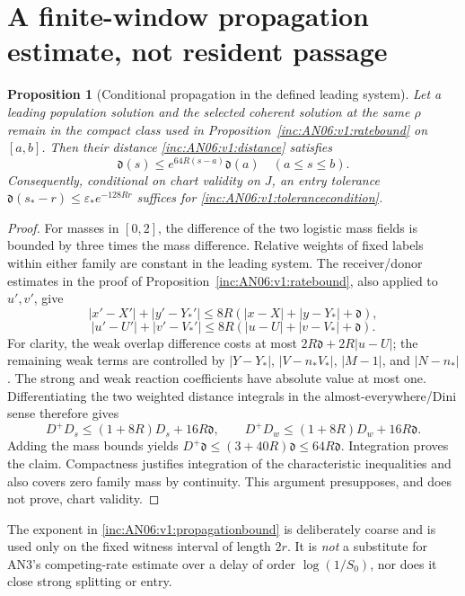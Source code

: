 \documentclass[11pt]{article}
\numberwithin{equation}{section}
\newtheorem{proposition}[theorem]{Proposition}
\theoremstyle{remark}\newtheorem{remark}[theorem]{Remark}
\newcommand{\1}{\mathbf 1}
\begin{document}
\section{A finite-window propagation estimate, not resident passage}
\label{inc:AN06:v1:finitewindow}
\begin{proposition}[Conditional propagation in the defined leading system]
\label{inc:AN06:v1:propagation}
Let a leading population solution and the selected coherent solution at
the same $\rho$ remain in the compact class used in
Proposition~\ref{inc:AN06:v1:ratebound} on $[a,b]$.
Then their distance \eqref{inc:AN06:v1:distance} satisfies
\begin{equation}\label{inc:AN06:v1:propagationbound}
 \mathfrak d(s)\le e^{64R(s-a)}\mathfrak d(a)
 \quad(a\le s\le b).
\end{equation}
Consequently, conditional on chart validity on $J$, an entry tolerance
$\mathfrak d(s_*-r)\le\varepsilon_*e^{-128Rr}$ suffices for
\eqref{inc:AN06:v1:tolerancecondition}.
\end{proposition}
\begin{proof}
For masses in $[0,2]$, the difference of the two logistic mass fields is
bounded by three times the mass difference. Relative weights of fixed
labels within either family are constant in the leading system.
The receiver/donor estimates in the proof of
Proposition~\ref{inc:AN06:v1:ratebound}, also applied to $u',v'$, give
\[
 |x'-X'|+|y'-Y_*'|\le8R(|x-X|+|y-Y_*|+\mathfrak d),
\]
\[
 |u'-U'|+|v'-V_*'|\le8R(|u-U|+|v-V_*|+\mathfrak d).
\]
For clarity, the weak overlap difference costs at most
$2R\mathfrak d+2R|u-U|$; the remaining weak terms are controlled by
$|Y-Y_*|$, $|V-n_*V_*|$, $|M-1|$, and $|N-n_*|$.
The strong and weak reaction coefficients have absolute value at most
one. Differentiating the two weighted distance integrals in the
almost-everywhere/Dini sense therefore gives
\[
 D^+D_s\le(1+8R)D_s+16R\mathfrak d,\qquad
 D^+D_w\le(1+8R)D_w+16R\mathfrak d.
\]
Adding the mass bounds yields
$D^+\mathfrak d\le(3+40R)\mathfrak d\le64R\mathfrak d$.
Integration proves the claim. Compactness justifies integration of the
characteristic inequalities and also covers zero family mass by
continuity. This argument presupposes, and does not prove, chart validity.
\end{proof}

The exponent in \eqref{inc:AN06:v1:propagationbound} is deliberately
coarse and is used only on the fixed witness interval of length $2r$.
It is \emph{not} a substitute for AN3's competing-rate estimate over a
delay of order $\log(1/S_0)$, nor does it close strong splitting or entry.
\end{document}
